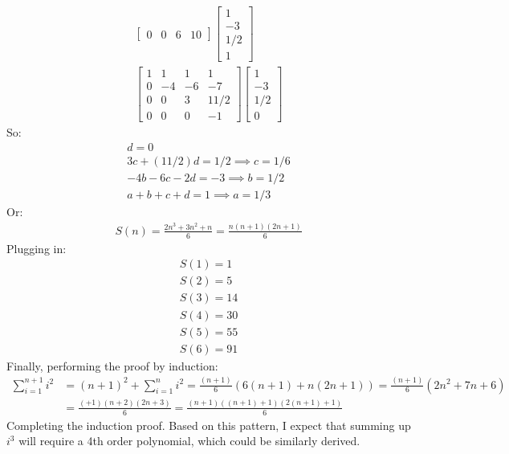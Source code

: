 \documentclass{article}
\begin{document}
\begin{gather*}
\begin{bmatrix}
		0 & 0 & 6 & 10
	\end{bmatrix}
	\begin{bmatrix}
		1\\
		-3\\
		1/2\\
		1
	\end{bmatrix}\\
	\begin{bmatrix}
		1 & 1 & 1 & 1\\
		0 & -4 & -6 & -7\\
		0 & 0 & 3 & 11/2\\
		0 & 0 & 0 & -1
	\end{bmatrix}
	\begin{bmatrix}
		1\\
		-3\\
		1/2\\
		0
	\end{bmatrix}
\end{gather*}
So:
\begin{gather*}
	d = 0\\
	3c + (11/2)d = 1/2 \implies c = 1/6\\
	-4b - 6c - 2d = -3 \implies b = 1/2\\
	a + b + c + d = 1 \implies a = 1/3
\end{gather*}
Or:
\begin{gather*}
	S(n) =  \frac{2n^{3} + 3n^{2} + n}{6} = \frac{n(n + 1)(2n + 1)}{6}
\end{gather*}
Plugging in:
\begin{gather*}
	S(1) = 1\\
	S(2) = 5\\
	S(3) = 14\\
	S(4) = 30\\
	S(5) = 55\\
	S(6) = 91
\end{gather*}
Finally, performing the proof by induction:
\begin{align*}
	\sum_{i = 1}^{n + 1}i^{2} &= (n+1)^{2} + \sum_{i = 1}^{n}i^{2} = \frac{(n + 1)}{6}(6(n + 1) + n(2n + 1)) = \frac{(n + 1)}{6}(2n^{2} + 7n + 6)\\
	&= \frac{( + 1)(n + 2)(2n + 3)}{6} = \frac{(n + 1)((n + 1) + 1)(2(n + 1) + 1)}{6}
\end{align*}
Completing the induction proof. Based on this pattern, I expect that summing up $i^{3}$ will require a 4th order polynomial, which could be similarly derived.  
\end{document}

